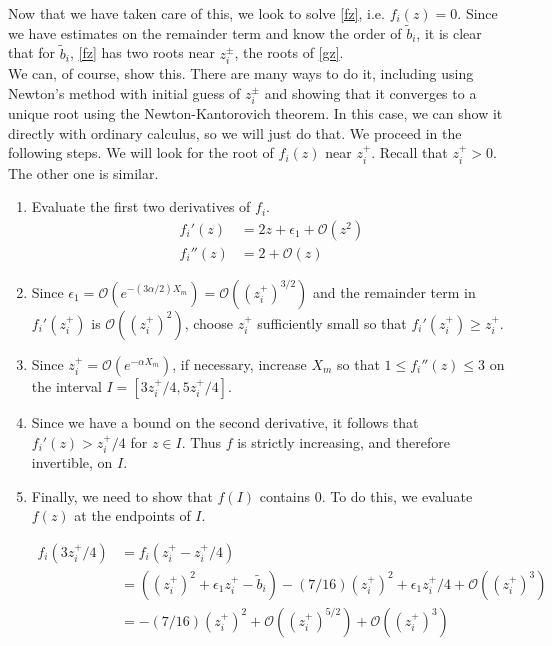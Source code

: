 \documentclass[12pt]{article}
\begin{document}
Now that we have taken care of this, we look to solve \eqref{fz}, i.e. $f_i(z) = 0$. Since we have estimates on the remainder term and know the order of $\tilde{b}_i$, it is clear that for $\tilde{b}_i$, \eqref{fz} has two roots near $z_i^\pm$, the roots of \eqref{gz}. \\

We can, of course, show this. There are many ways to do it, including using Newton's method with initial guess of $z_i^\pm$ and showing that it converges to a unique root using the Newton-Kantorovich theorem. In this case, we can show it directly with ordinary calculus, so we will just do that. We proceed in the following steps. We will look for the root of $f_i(z)$ near $z_i^+$. Recall that $z_i^+ > 0$. The other one is similar.

\begin{enumerate}

\item Evaluate the first two derivatives of $f_i$. 
\begin{align*}
f_i'(z) &= 2z + \epsilon_1 + \mathcal{O}(z^2) \\
f_i''(z) &= 2 + \mathcal{O}(z)
\end{align*}

\item Since $\epsilon_1 = \mathcal{O}(e^{-(3 \alpha/2) X_m}) = \mathcal{O}((z_i^+)^{3/2})$ and the remainder term in $f_i'(z_i^+)$ is $\mathcal{O}((z_i^+)^2)$, choose $z_i^+$ sufficiently small so that $f_i'(z_i^+) \geq z_i^+$.

\item Since $z_i^+ = \mathcal{O}(e^{-\alpha X_m})$, if necessary, increase $X_m$ so that $1 \leq f_i''(z) \leq 3$ on the interval $I = [3 z_i^+ /4, 5 z_i^+/4]$.

\item Since we have a bound on the second derivative, it follows that $f_i'(z) > z_i^+/4$ for $z \in I$. Thus $f$ is strictly increasing, and therefore invertible, on $I$. 

\item Finally, we need to show that $f(I)$ contains 0. To do this, we evaluate $f(z)$ at the endpoints of $I$.

\begin{align*}
f_i(3 z_i^+/4) &= f_i(z_i^+ - z_i^+/4) \\
&= ((z_i^+)^2 + \epsilon_1 z_i^+ - \tilde{b}_i) - (7/16)(z_i^+)^2 
+ \epsilon_1 z_i^+/4 + \mathcal{O}((z_i^+)^3) \\
&= - (7/16)(z_i^+)^2 + \mathcal{O}((z_i^+)^{5/2}) + \mathcal{O}((z_i^+)^3)
\end{align*}


\end{enumerate}
\end{document}
